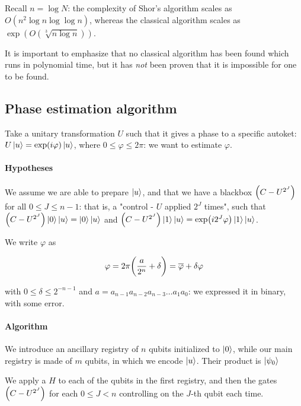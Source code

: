 \documentclass[main.tex]{subfiles}
\begin{document}
Recall \( n = \log N \): the complexity of Shor's algorithm scales as \( O(n^2 \log n \log \log n) \), whereas the classical algorithm scales as \( \exp(O(\sqrt[3]{n\log n})) \).

It is important to emphasize that no classical algorithm has been found which runs in polynomial time, but it has \emph{not} been proven that it is impossible for one to be found.

\subsection{Phase estimation algorithm} \label{sec:phase-estimation}

Take a unitary transformation \(U\) such that it gives a phase to a specific autoket: \(U \ket{u}  = \exp(i \varphi) \ket{u} \), where \(0 \leq \varphi \leq 2 \pi \): we want to estimate \(\varphi\).

\paragraph{Hypotheses}

We assume we are able to prepare \(\ket{u} \), and that we have a blackbox \(\qty(C-U ^{2^J})\) for all \(0 \leq J \leq n-1\): that is, a "control - \(U\) applied \(2^J\) times", such that \(\qty(C-U ^{2^J})\ket{0}\ket{u} = \ket{0} \ket{u}  \) and \(\qty(C-U ^{2^J})\ket{1}\ket{u} = \exp(i 2^J \varphi)  \ket{1} \ket{u}  \).

We write \(\varphi\) as

\begin{equation}
  \varphi = 2 \pi \qty(\frac{a}{2^n} + \delta) = \overline{\varphi} + \delta \varphi
\end{equation}

with \(0 \leq \delta \leq 2 ^{-n-1} \)
and \(a = a _{n-1} a _{n-2} a _{n-3} \dots a_1 a_0 \): we expressed it in binary, with some error.

\paragraph{Algorithm}

We introduce an ancillary registry of \(n\) qubits initialized to \(\ket{0} \), while our main registry is made of \(m\) qubits, in which we encode \(\ket{u} \). Their product is \(\ket{\psi_0}\)

We apply a \(H\) to each of the qubits in the first registry, and then the gates \(\qty(C-U^{2^J})\) for each \(0 \leq J < n\) controlling on the \(J\)-th qubit each time.
\end{document}
